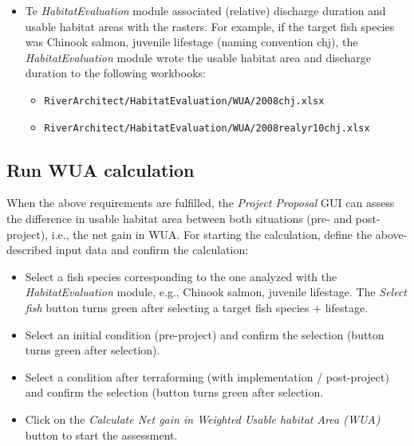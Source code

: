 \begin{itemize}
\begin{itemize}
    \begin{itemize}
    \item \texttt{RiverArchitect/HabitatEvaluation/WUA/Rasters/2008} (existing / pre-project)
    \item \texttt{RiverArchitect/HabitatEvaluation/WUA/Rasters/2008{\myUnderscore}rea{\myUnderscore}lyr10} (with implementation / post-project)
    \end{itemize}
  \item Te \emph{HabitatEvaluation} module associated (relative) discharge duration and usable habitat areas with the rasters. For example, if the target fish species was Chinook salmon, juvenile lifestage (naming convention chj), the \emph{HabitatEvaluation} module wrote the usable habitat area and discharge duration to the following workbooks:
    \begin{itemize}
    \item \texttt{RiverArchitect/HabitatEvaluation/WUA/2008{\myUnderscore}chj.xlsx}
    \item \texttt{RiverArchitect/HabitatEvaluation/WUA/2008{\myUnderscore}rea{\myUnderscore}lyr10{\myUnderscore}chj.xlsx}
    \end{itemize}
  \end{itemize}
\end{itemize}

\subsection{Run WUA calculation}
When the above requirements are fulfilled, the \emph{Project Proposal} GUI can assess the difference in usable habitat area between both situations (pre- and post-project), i.e., the net gain in WUA. For starting the calculation, define the above-described input data and confirm the calculation:
\begin{itemize}
\item Select a fish species corresponding to the one analyzed with the \emph{HabitatEvaluation} module, e.g., Chinook salmon, juvenile lifestage. The \emph{Select fish} button turns green after selecting a target fish species + lifestage.
\item Select an initial condition (pre-project) and confirm the selection (button turns green after selection).
\item Select a condition after terraforming (with implementation / post-project) and confirm the selection (button turns green after selection.
\item Click on the \emph{Calculate Net gain in Weighted Usable habitat Area (WUA)} button to start the assessment.
\end{itemize}

